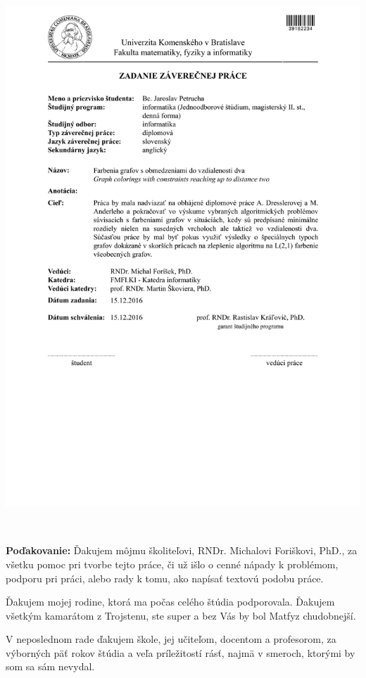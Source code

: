 \documentclass[12pt, oneside]{book}
\begin{document}
\newpage 
\thispagestyle{empty}
\hspace{-2cm}\includegraphics[width=1.1\textwidth]{images/zadanie}


\frontmatter

\setcounter{page}{3}
\newpage 
~

\vfill
{\bf Poďakovanie:} Ďakujem môjmu školiteľovi, RNDr. Michalovi Foriškovi, PhD., za všetku
pomoc pri tvorbe tejto práce, či už išlo o cenné nápady k problémom, podporu pri
práci, alebo rady k tomu, ako napísať textovú podobu práce.

Ďakujem mojej rodine, ktorá ma počas celého štúdia podporovala. Ďakujem všetkým kamarátom
z Trojstenu, ste super a bez Vás by bol Matfyz chudobnejší.

V neposlednom rade ďakujem škole, jej učiteľom, docentom a profesorom, za výborných päť
rokov štúdia a veľa príležitostí rásť, najmä v smeroch, ktorými by som sa sám nevydal.
\end{document}
